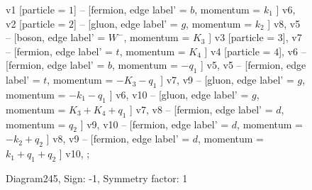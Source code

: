 \documentclass{revtex4}
\begin{document}
\begin{figure}[!htb]
\begin{center}
{    %
v1 [particle = \(1\)] -- [fermion, edge label' = \(b\), momentum = \(k_{1}\) ] v6, 
v2 [particle = \(2\)] -- [gluon, edge label' = \(g\), momentum = \(k_{2}\) ] v8, 
v5 -- [boson, edge label' = \(W^{-}\), momentum = \(K_{3}\) ] v3 [particle = \(3\)], 
v7 -- [fermion, edge label' = \(t\), momentum = \(K_{4}\) ] v4 [particle = \(4\)], 
v6 -- [fermion, edge label' = \(b\), momentum = \(-q_{1}\) ] v5, 
v5 -- [fermion, edge label' = \(t\), momentum = \(-K_{3} - q_{1}\) ] v7, 
v9 -- [gluon, edge label' = \(g\), momentum = \(-k_{1} - q_{1}\) ] v6, 
v10 -- [gluon, edge label' = \(g\), momentum = \(K_{3} + K_{4} + q_{1}\) ] v7, 
v8 -- [fermion, edge label' = \(d\), momentum = \(q_{2}\) ] v9, 
v10 -- [fermion, edge label' = \(d\), momentum = \(-k_{2} + q_{2}\) ] v8, 
v9 -- [fermion, edge label' = \(d\), momentum = \(k_{1} + q_{1} + q_{2}\) ] v10, 
};
\end{center}
\caption{Diagram245, Sign: -1, Symmetry factor: 1}
\end{figure}
\newpage
\end{document}
